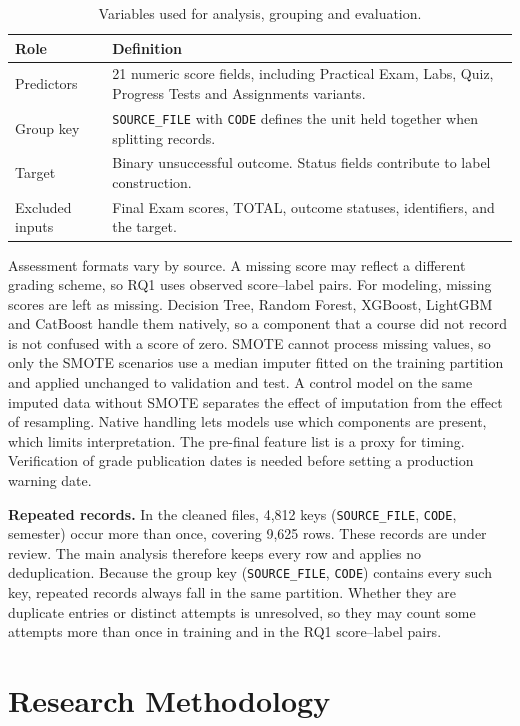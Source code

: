 \documentclass[runningheads]{llncs}
\begin{document}
\begin{table}[h]
\caption{Variables used for analysis, grouping and evaluation.}
\label{tab:vars}
\centering
\begin{tabular}{p{3.0cm}p{8.0cm}}
\toprule
Role & Definition \\
\midrule
Predictors & 21 numeric score fields, including Practical Exam, Labs, Quiz, Progress Tests and Assignments variants. \\
Group key & \texttt{SOURCE\_FILE} with \texttt{CODE} defines the unit held together when splitting records. \\
Target & Binary unsuccessful outcome. Status fields contribute to label construction. \\
Excluded inputs & Final Exam scores, TOTAL, outcome statuses, identifiers, and the target. \\
\bottomrule
\end{tabular}
\end{table}

Assessment formats vary by source. A missing score may reflect a different grading scheme, so RQ1 uses observed score--label pairs.
For modeling, missing scores are left as missing. Decision Tree, Random Forest, XGBoost, LightGBM and CatBoost handle them natively, so a component that a course did not record is not confused with a score of zero. SMOTE cannot process missing values, so only the SMOTE scenarios use a median imputer fitted on the training partition and applied unchanged to validation and test. A control model on the same imputed data without SMOTE separates the effect of imputation from the effect of resampling. Native handling lets models use which components are present, which limits interpretation. The pre-final feature list is a proxy for timing. Verification of grade publication dates is needed before setting a production warning date.

\textbf{Repeated records.} In the cleaned files, 4,812 keys (\texttt{SOURCE\_FILE}, \texttt{CODE}, semester) occur more than once, covering 9,625 rows. These records are under review. The main analysis therefore keeps every row and applies no deduplication. Because the group key (\texttt{SOURCE\_FILE}, \texttt{CODE}) contains every such key, repeated records always fall in the same partition. Whether they are duplicate entries or distinct attempts is unresolved, so they may count some attempts more than once in training and in the RQ1 score--label pairs.

\section{Research Methodology}
\end{document}

